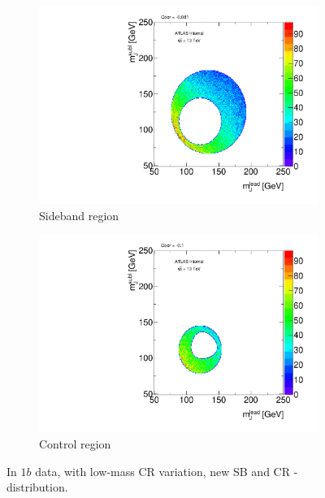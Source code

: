 \begin{figure}[htbp!]
\centering
\captionsetup{justification=centering}
    \begin{subfigure}[b]{0.39\textwidth}
        \includegraphics[width=\textwidth,angle=-90]{figures/boosted/Syst_CRSB/CR_Low_Sideband_OneTag_mH0H1.pdf}
        \caption{Sideband region}
        \label{CRSB:CR_Low_SB}
    \end{subfigure}
    \quad
    \begin{subfigure}[b]{0.39\textwidth}
        \includegraphics[width=\textwidth,angle=-90]{figures/boosted/Syst_CRSB/CR_Low_Control_OneTag_mH0H1.pdf}
        \caption{Control region}
        \label{CRSB:CR_Low_CR}
    \end{subfigure}
\caption{In $1b$ data, with low-mass CR variation, new SB and CR \mleadJ-\msublJ distribution.}
\label{CRSB:CR_Low}
\end{figure}


